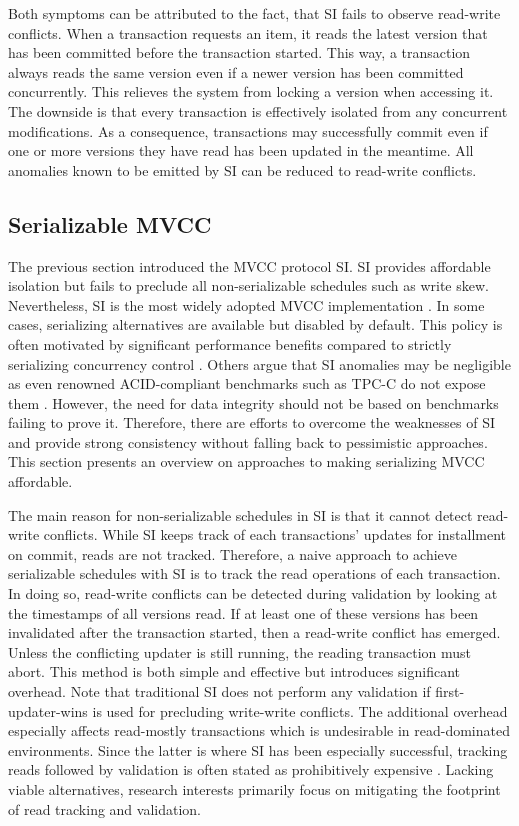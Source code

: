 Both symptoms can be attributed to the fact, that SI fails to observe read-write
conflicts. When a transaction requests an item, it reads the latest version that
has been committed before the transaction started. This way, a transaction
always reads the same version even if a newer version has been committed
concurrently. This relieves the system from locking a version when accessing it.
The downside is that every transaction is effectively isolated from any
concurrent modifications. As a consequence, transactions may successfully commit
even if one or more versions they have read has been updated in the meantime.
All anomalies known to be emitted by SI can be reduced to read-write conflicts.

\subsection{Serializable MVCC}

The previous section introduced the MVCC protocol SI. SI provides affordable
isolation but fails to preclude all non-serializable schedules such as write
skew. Nevertheless, SI is the most widely adopted MVCC implementation
\cite{larson2011high, bailey2013exploring, neumann2015fast}. In some cases,
serializing alternatives are available but disabled by default. This policy is
often motivated by significant performance benefits compared to strictly
serializing concurrency control \cite{cahill2009serializable}. Others argue that
SI anomalies may be negligible as even renowned ACID-compliant benchmarks such
as TPC-C do not expose them \cite{fekete2005making}. However, the need for data
integrity should not be based on benchmarks failing to prove it. Therefore,
there are efforts to overcome the weaknesses of SI and provide strong
consistency without falling back to pessimistic approaches. This section
presents an overview on approaches to making serializing MVCC affordable.

The main reason for non-serializable schedules in SI is that it cannot detect
read-write conflicts. While SI keeps track of each transactions' updates for
installment on commit, reads are not tracked. Therefore, a naive approach to
achieve serializable schedules with SI is to track the read operations of each
transaction. In doing so, read-write conflicts can be detected during validation
by looking at the timestamps of all versions read. If at least one of these
versions has been invalidated after the transaction started, then a read-write
conflict has emerged. Unless the conflicting updater is still running, the
reading transaction must abort. This method is both simple and effective but
introduces significant overhead. Note that traditional SI does not perform any
validation if first-updater-wins is used for precluding write-write conflicts.
The additional overhead especially affects read-mostly transactions which is
undesirable in read-dominated environments. Since the latter is where SI has
been especially successful, tracking reads followed by validation is often
stated as prohibitively expensive \cite{cahill2009serializable}. Lacking viable
alternatives, research interests primarily focus on mitigating the footprint of
read tracking and validation.

